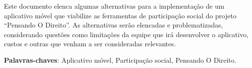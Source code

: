 \setlength{\absparsep}{18pt} %
\begin{resumo}
Este documento elenca algumas alternativas para a implementação de um aplicativo móvel que viabilize as ferramentas de participação social do projeto ``Pensando O Direito''.
As alternativas serão elencadas e problematizadas, considerando questões como limitações da equipe que irá desenvolver o aplicativo, custos e outras que venham a ser consideradas relevantes.

%
 \vfill
 \noindent
 \textbf{Palavras-chaves}: Aplicativo móvel, Participação social, Pensando O Direito.
 \vfill
\end{resumo}
